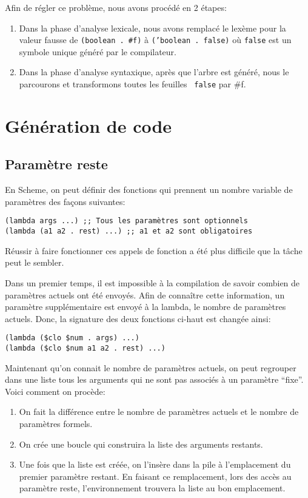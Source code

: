 \documentclass[10pt]{report}
\begin{document}
Afin de régler ce problème, nous avons procédé en 2 étapes:

\begin{enumerate}
\item Dans la phase d'analyse lexicale, nous avons remplacé le lexème
  pour la valeur fausse de {\tt (boolean . \#f)} à {\tt ('boolean .
    false)} où {\tt false} est un symbole unique généré par le
  compilateur.
\item Dans la phase d'analyse syntaxique, après que l'arbre est
  généré, nous le parcourons et transformons toutes les feuilles {\tt
    false} par \#f.
\end{enumerate}

\section{Génération de code}

\subsection{Paramètre reste}

En Scheme, on peut définir des fonctions qui prennent un nombre
variable de paramètres des façons suivantes:

\begin{verbatim}
(lambda args ...) ;; Tous les paramètres sont optionnels
(lambda (a1 a2 . rest) ...) ;; a1 et a2 sont obligatoires
\end{verbatim}

Réussir à faire fonctionner ces appels de fonction a été plus
difficile que la tâche peut le sembler.

Dans un premier temps, il est impossible à la compilation de savoir
combien de paramètres actuels ont été envoyés.  Afin de connaître
cette information, un paramètre supplémentaire est envoyé à la lambda,
le nombre de paramètres actuels.  Donc, la signature des deux
fonctions ci-haut est changée ainsi:

\begin{verbatim}
(lambda ($clo $num . args) ...)
(lambda ($clo $num a1 a2 . rest) ...)
\end{verbatim}

Maintenant qu'on connait le nombre de paramètres actuels, on peut
regrouper dans une liste tous les arguments qui ne sont pas associés
à un paramètre ``fixe''.  Voici comment on procède:

\begin{enumerate}
\item On fait la différence entre le nombre de paramètres actuels et
  le nombre de paramètres formels.
\item On crée une boucle qui construira la liste des arguments restants.
\item Une fois que la liste est créée, on l'insère dans la pile à
  l'emplacement du premier paramètre restant.  En faisant ce
  remplacement, lors des accès au paramètre reste, l'environnement
  trouvera la liste au bon emplacement.
\end{enumerate}
\end{document}
